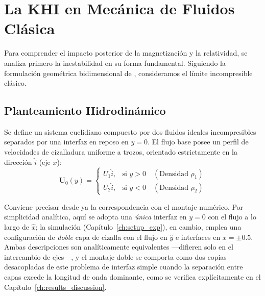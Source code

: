 \section{La KHI en Mecánica de Fluidos Clásica}

\primerparrafo Para comprender el impacto posterior de la magnetización y la relatividad, se analiza primero la inestabilidad en su forma fundamental. Siguiendo la formulación geométrica bidimensional de \textcite{acheson-1990}, consideramos el límite incompresible clásico.

\subsection{Planteamiento Hidrodinámico}

\primerparrafo Se define un sistema euclidiano compuesto por dos fluidos ideales incompresibles separados por una interfaz en reposo en $y = 0$. El flujo base posee un perfil de velocidades de cizalladura uniforme a trozos, orientado estrictamente en la dirección $\hat{i}$ (eje $x$):
\begin{equation}
    \mathbf{U}_{0}(y) = 
    \begin{cases} 
        U_1 \hat{i}, & \text{si } y > 0 \quad (\text{Densidad } \rho_1) \\
        U_2 \hat{i}, & \text{si } y < 0 \quad (\text{Densidad } \rho_2)
    \end{cases}
\end{equation}

\primerparrafo Conviene precisar desde ya la correspondencia con el montaje numérico. Por simplicidad analítica, aquí se adopta una \emph{única} interfaz en $y=0$ con el flujo a lo largo de $\hat{x}$; la simulación (Capítulo~\ref{ch:setup_exp}), en cambio, emplea una configuración de \emph{doble} capa de cizalla con el flujo en $\hat{y}$ e interfaces en $x=\pm0.5$. Ambas descripciones son analíticamente equivalentes ---difieren solo en el intercambio de ejes---, y el montaje doble se comporta como dos copias desacopladas de este problema de interfaz simple cuando la separación entre capas excede la longitud de onda dominante, como se verifica explícitamente en el Capítulo~\ref{ch:results_discussion}.


